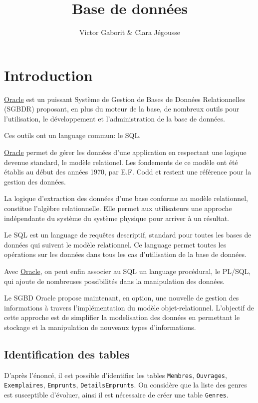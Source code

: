 \documentclass[10pt, oneside]{article}
\title{Base de données}
\author{Victor Gaborit \& Clara Jégousse}
\date{}
\begin{document}
\maketitle

\section*{Introduction}

\href{http://www.oracle.com}{Oracle} est un puissant Système de Gestion de Bases de Données Relationnelles (SGBDR) proposant, en plus du moteur de la base, de nombreux outils pour l'utilisation, le développement et l'administration de la base de données.

Ces outils ont un language commun: le SQL.

\href{http://www.oracle.com}{Oracle} permet de gérer les données d'une application en respectant une logique devenue standard, le modèle relationel. Les fondements de ce modèle ont été établis au début des années 1970, par E.F. Codd et restent une référence pour la gestion des données.

La logique d'extraction des données d'une base conforme au modèle relationnel, constitue l'algèbre relationnelle. Elle permet aux utilisateurs une approche indépendante du système du système physique pour arriver à un résultat.

Le SQL est un language de requêtes descriptif, standard pour toutes les bases de données qui suivent le modèle relationnel. Ce language permet toutes les opérations sur les données dans tous les cas d'utilisation de la base de données.

Avec \href{http://www.oracle.com}{Oracle}, on peut enfin associer au SQL un language procédural, le PL/SQL, qui ajoute de nombreuses possibilités dans la manipulation des données.

Le SGBD Oracle propose maintenant, en option, une nouvelle de gestion des informations à travers l'implémentation du modèle objet-relationnel. L'objectif de cette approche est de simplifier la modelisation des données en permettant le stockage et la manipulation de nouveaux types d'informations. 

\subsection*{Identification des tables}

D'après l'énoncé, il est possible d'identifier les tables \texttt{Membres}, \texttt{Ouvrages}, \texttt{Exemplaires}, \texttt{Emprunts}, \texttt{DetailsEmprunts}. On considère que la liste des genres est susceptible d'évoluer, ainsi il est nécessaire de créer une table \texttt{Genres}.
\end{document}
